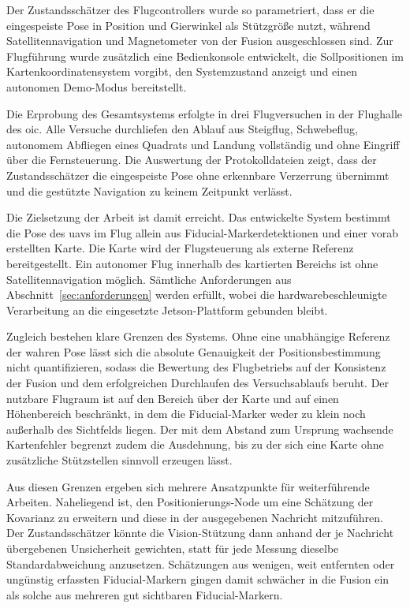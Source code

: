 Der Zustandsschätzer des Flugcontrollers wurde so parametriert, dass er die eingespeiste Pose in Position und Gierwinkel als Stützgröße nutzt, während Satellitennavigation und Magnetometer von der Fusion ausgeschlossen sind.
Zur Flugführung wurde zusätzlich eine Bedienkonsole entwickelt, die Sollpositionen im Kartenkoordinatensystem vorgibt, den Systemzustand anzeigt und einen autonomen Demo-Modus bereitstellt.

Die Erprobung des Gesamtsystems erfolgte in drei Flugversuchen in der Flughalle des \gls{oic}.
Alle Versuche durchliefen den Ablauf aus Steigflug, Schwebeflug, autonomem Abfliegen eines Quadrats und Landung vollständig und ohne Eingriff über die Fernsteuerung.
Die Auswertung der Protokolldateien zeigt, dass der Zustandsschätzer die eingespeiste Pose ohne erkennbare Verzerrung übernimmt und die gestützte Navigation zu keinem Zeitpunkt verlässt.

Die Zielsetzung der Arbeit ist damit erreicht.
Das entwickelte System bestimmt die Pose des \gls{uav}s im Flug allein aus Fiducial-Markerdetektionen und einer vorab erstellten Karte.
Die Karte wird der Flugsteuerung als externe Referenz bereitgestellt.
Ein autonomer Flug innerhalb des kartierten Bereichs ist ohne Satellitennavigation möglich.
Sämtliche Anforderungen aus Abschnitt~\ref{sec:anforderungen} werden erfüllt, wobei die hardwarebeschleunigte Verarbeitung an die eingesetzte Jetson-Plattform gebunden bleibt.

Zugleich bestehen klare Grenzen des Systems.
Ohne eine unabhängige Referenz der wahren Pose lässt sich die absolute Genauigkeit der Positionsbestimmung nicht quantifizieren, sodass die Bewertung des Flugbetriebs auf der Konsistenz der Fusion und dem erfolgreichen Durchlaufen des Versuchsablaufs beruht.
Der nutzbare Flugraum ist auf den Bereich über der Karte und auf einen Höhenbereich beschränkt, in dem die Fiducial-Marker weder zu klein noch außerhalb des Sichtfelds liegen.
Der mit dem Abstand zum Ursprung wachsende Kartenfehler begrenzt zudem die Ausdehnung, bis zu der sich eine Karte ohne zusätzliche Stützstellen sinnvoll erzeugen lässt.

Aus diesen Grenzen ergeben sich mehrere Ansatzpunkte für weiterführende Arbeiten.
Naheliegend ist, den Positionierungs-Node um eine Schätzung der Kovarianz zu erweitern und diese in der ausgegebenen Nachricht mitzuführen.
Der Zustandsschätzer könnte die Vision-Stützung dann anhand der je Nachricht übergebenen Unsicherheit gewichten, statt für jede Messung dieselbe Standardabweichung anzusetzen.
Schätzungen aus wenigen, weit entfernten oder ungünstig erfassten Fiducial-Markern gingen damit schwächer in die Fusion ein als solche aus mehreren gut sichtbaren Fiducial-Markern.

